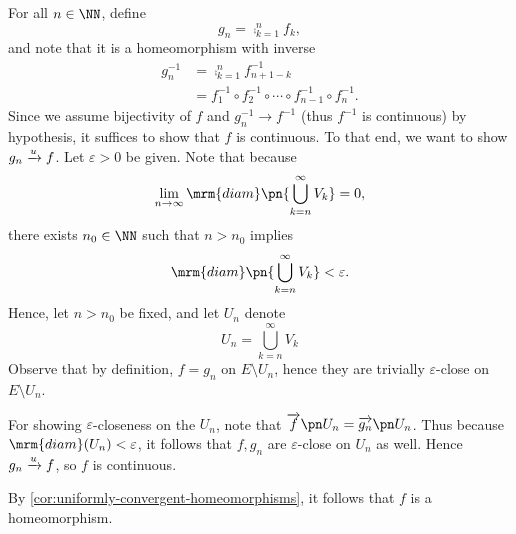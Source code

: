\begin{sproof}
  For all $n\in \NN$, define
  \[
    g_n = \comp_{k=1}^n f_k,
  \]
  and note that it is a homeomorphism with inverse
  \begin{align*}
    g^{-1}_n
    &= \comp_{k=1}^n f^{-1}_{n+1-k} \\
    &= f^{-1}_{1} \circ f^{-1}_2 \circ \cdots \circ f^{-1}_{n-1} \circ
      f^{-1}_n.
  \end{align*}
  Since we assume bijectivity of $f$ and $g_n^{-1} \to f^{-1}$ (thus
  $f^{-1}$ is continuous) by hypothesis, it suffices to show that $f$
  is continuous. To that end, we want to show $g_n \xrightarrow{u} f$. Let
  $\varepsilon > 0$ be given. Note that because
  \[
    \lim_{n\to\infty} \mrm{diam}\pn{\bigcup_{k=n}^\infty V_k} = 0,
  \]
  there exists $n_0 \in \NN$ such that $n > n_0$ implies
  \[
    \mrm{diam}\pn{\bigcup_{k=n}^\infty V_k} < \varepsilon.
  \]
  Hence, let $n > n_0$ be fixed, and let $U_n$ denote
  \[
    U_n = \bigcup_{k = n}^\infty V_k
  \]
  Observe that by definition, $f = g_n$ on $E \setminus U_n$, hence
  they are trivially $\varepsilon$-close on $E \setminus U_n$.

  For showing $\varepsilon$-closeness on the $U_n$, note that
  $\fim{f}{U_n} = \fim{g_n}{U_n}$. Thus because $\mrm{diam}(U_n) <
  \varepsilon$, it follows that $f, g_n$ are $\varepsilon$-close on
  $U_n$ as well. Hence $g_n \xrightarrow{u} f$, so $f$ is continuous.

  By \cref{cor:uniformly-convergent-homeomorphisms}, it follows that
  $f$ is a homeomorphism.
\end{sproof}




